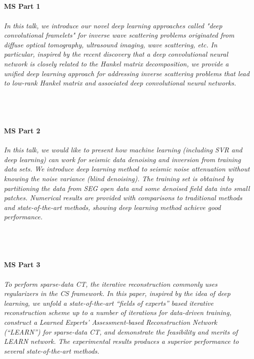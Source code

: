 \begin{multicols}{2}
\\ 
    \\
    \\\\
    \noindent\textbf{MS Part 1}\\
\\  
    \textit{In this talk, we introduce our novel deep learning approaches called "deep convolutional framelets" for inverse wave scattering problems originated from diffuse optical tomography, ultrasound imaging, wave scattering, etc.  In particular,  inspired by the recent discovery that  a deep convolutional neural network is closely related to the Hankel matrix decomposition,  we provide a unified deep learning approach for addressing  inverse scattering problems that lead to low-rank Hankel matrix and associated deep convolutional neural networks.}\\
\\ 
    \\
    \\\\
    \noindent\textbf{MS Part 2}\\
\\  
    \textit{In this talk, we would like to present how machine learning (including SVR and deep learning) can work for seismic data denoising and inversion from training data sets. We introduce deep learning method to seismic noise attenuation without knowing the noise variance (blind denoising). The training set is obtained by partitioning the data from SEG open data and some denoised field data into small patches. Numerical results are provided with comparisons to traditional methods and state-of-the-art methods, showing deep learning method achieve good performance.}\\
\\ 
    \\
    \\\\
    \noindent\textbf{MS Part 3}\\
\\  
    \textit{To perform sparse-data CT, the iterative reconstruction commonly uses regularizers in the CS framework. In this paper, inspired by the idea of deep learning, we unfold a state-of-the-art “fields of experts” based iterative reconstruction scheme up to a number of iterations for data-driven training, construct a Learned Experts’ Assessment-based Reconstruction Network (“LEARN”) for sparse-data CT, and demonstrate the feasibility and merits of LEARN network. The experimental results produces a superior performance  to several state-of-the-art methods.}\\

\end{multicols}
